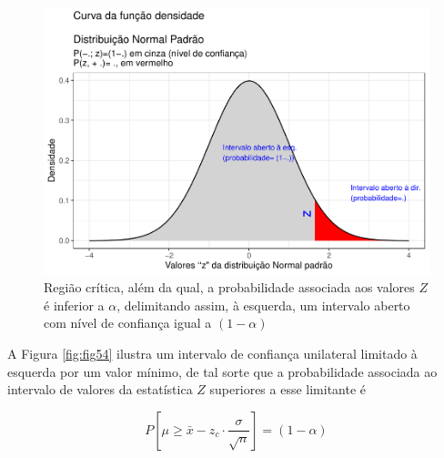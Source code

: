 \documentclass[
]{book}
\begin{document}
\begin{figure}

{\centering \includegraphics[width=1\linewidth]{apostila_files/figure-latex/fig53-1} 

}

\caption{Região crítica, além da qual, a probabilidade associada aos valores $Z$ é inferior a $\alpha$, delimitando assim, à esquerda, um intervalo aberto com nível de confiança igual a $(1-\alpha)$}\label{fig:fig53}
\end{figure}

\hfill\break

A Figura \ref{fig:fig54} ilustra um intervalo de confiança unilateral limitado à esquerda por um valor mínimo, de tal sorte que a probabilidade associada ao intervalo de valores da estatística \(Z\) superiores a esse limitante é

\hfill\break

\[
P\left [\mu \ge \bar{x} - {z}_{c} \cdot  \frac{\sigma}{\sqrt{n}} \right ] = (1- \alpha)
\]

\hfill\break
\end{document}
